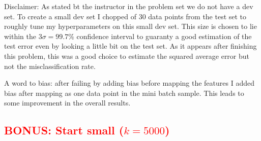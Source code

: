 \documentclass[12pt]{article}
\begin{document}
Disclaimer: As stated bt the instructor in the problem set we do not have a dev set. To create a small dev set I chopped of 30 data points from the test set to roughly tune my hyperparameters on this small dev set. This size is chosen to lie within the $3\sigma=99.7\%$ confidence interval to guaranty a good estimation of the test error even by looking a little bit on the test set. As it appears after finishing this problem, this was a good choice to estimate the squared average error but not the misclassification rate.  \par 
A word to bias: after failing by adding bias before mapping the features I added bias after mapping as one data point in the mini batch sample. This leads to some improvement in the overall results. 

\subsection{\textcolor{red}{BONUS: Start small ($k=5000$)}}
\end{document}
